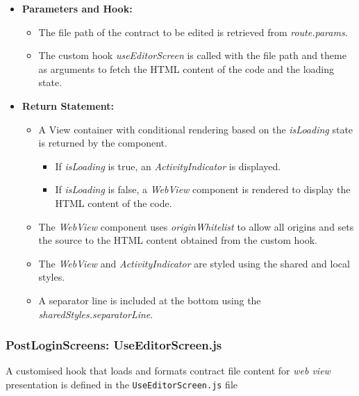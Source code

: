 \begin{itemize}
    \item \textbf{Parameters and Hook:}
    \begin{itemize}
        \item The file path of the contract to be edited is retrieved from \textit{route.params}.
        \item The custom hook \textit{useEditorScreen} is called with the file path and theme as arguments to fetch the HTML content of the code and the loading state.
    \end{itemize}

    \item \textbf{Return Statement:}
    \begin{itemize}
        \item A View container with conditional rendering based on the \textit{isLoading} state is returned by the component.
        \begin{itemize}
            \item If \textit{isLoading} is true, an \textit{ActivityIndicator} is displayed.
            \item If \textit{isLoading} is false, a \textit{WebView} component is rendered to display the HTML content of the code.
        \end{itemize}
        \item The \textit{WebView} component uses \textit{originWhitelist} to allow all origins and sets the source to the HTML content obtained from the custom hook.
        \item The \textit{WebView} and \textit{ActivityIndicator} are styled using the shared and local styles.
        
        \item A separator line is included at the bottom using the \textit{sharedStyles.separatorLine}.
    \end{itemize}
\end{itemize}

\subsubsection{PostLoginScreens: UseEditorScreen.js}

A customised hook that loads and formats contract file content for \textit{web view} presentation is defined in the \texttt{UseEditorScreen.js} file

